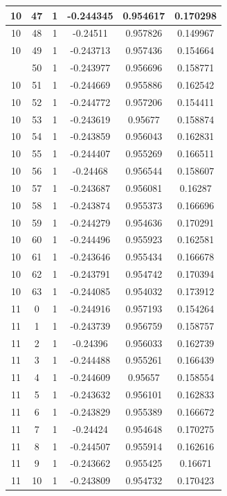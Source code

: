\documentclass[12pt,a4paper]{article}
\numberwithin{equation}{section}
\numberwithin{figure}{section}
\numberwithin{table}{section}
\begin{document}
\begin{longtable}{|c|c|c|c|c|c|}
10 & 47 & 1 & -0.244345 & 0.954617 & 0.170298 \\ \hline
10 & 48 & 1 & -0.24511 & 0.957826 & 0.149967 \\ \hline
10 & 49 & 1 & -0.243713 & 0.957436 & 0.154664 \\ \hline
\pagebreak
10 & 50 & 1 & -0.243977 & 0.956696 & 0.158771 \\ \hline
10 & 51 & 1 & -0.244669 & 0.955886 & 0.162542 \\ \hline
10 & 52 & 1 & -0.244772 & 0.957206 & 0.154411 \\ \hline
10 & 53 & 1 & -0.243619 & 0.95677 & 0.158874 \\ \hline
10 & 54 & 1 & -0.243859 & 0.956043 & 0.162831 \\ \hline
10 & 55 & 1 & -0.244407 & 0.955269 & 0.166511 \\ \hline
10 & 56 & 1 & -0.24468 & 0.956544 & 0.158607 \\ \hline
10 & 57 & 1 & -0.243687 & 0.956081 & 0.16287 \\ \hline
10 & 58 & 1 & -0.243874 & 0.955373 & 0.166696 \\ \hline
10 & 59 & 1 & -0.244279 & 0.954636 & 0.170291 \\ \hline
10 & 60 & 1 & -0.244496 & 0.955923 & 0.162581 \\ \hline
10 & 61 & 1 & -0.243646 & 0.955434 & 0.166678 \\ \hline
10 & 62 & 1 & -0.243791 & 0.954742 & 0.170394 \\ \hline
10 & 63 & 1 & -0.244085 & 0.954032 & 0.173912 \\ \hline
11 & 0 & 1 & -0.244916 & 0.957193 & 0.154264 \\ \hline
11 & 1 & 1 & -0.243739 & 0.956759 & 0.158757 \\ \hline
11 & 2 & 1 & -0.24396 & 0.956033 & 0.162739 \\ \hline
11 & 3 & 1 & -0.244488 & 0.955261 & 0.166439 \\ \hline
11 & 4 & 1 & -0.244609 & 0.95657 & 0.158554 \\ \hline
11 & 5 & 1 & -0.243632 & 0.956101 & 0.162833 \\ \hline
11 & 6 & 1 & -0.243829 & 0.955389 & 0.166672 \\ \hline
11 & 7 & 1 & -0.24424 & 0.954648 & 0.170275 \\ \hline
11 & 8 & 1 & -0.244507 & 0.955914 & 0.162616 \\ \hline
11 & 9 & 1 & -0.243662 & 0.955425 & 0.16671 \\ \hline
11 & 10 & 1 & -0.243809 & 0.954732 & 0.170423 \\ \hline

\end{longtable}
\end{document}
